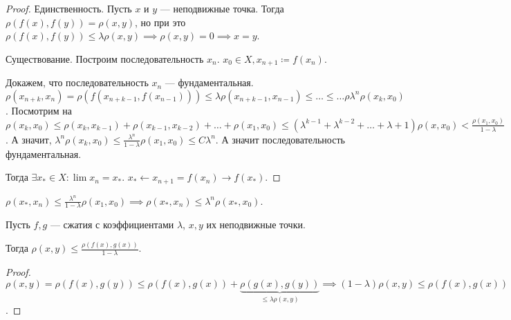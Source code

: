 \begin{proof}
    Единственность. Пусть $x$ и  $y$ --- неподвижные точка. Тогда  $\rho(f(x), f(y)) = \rho(x, y)$, но при это  $\rho(f(x), f(y)) \le \lambda\rho(x, y) \implies \rho(x, y) = 0 \implies x = y$.

    Существование. Построим последовательность $x_n$.  $x_0 \in X, x_{n+1} \coloneqq f(x_n)$.

    Докажем, что последовательность  $x_n$ --- фундаментальная.  $\rho(x_{n+k}, x_n) = \rho(f(x_{n+k-1}, f(x_{n-1}))) \le \lambda \rho(x_{n+k-1}, x_{n-1}) \le \ldots \le \ldots \rho \lambda^n \rho(x_k, x_0)$. Посмотрим на $\rho(x_k, x_0) \le \rho(x_k, x_{k-1}) + \rho(x_{k-1}, x_{k-2}) + \ldots + \rho(x_1, x_0) \le (\lambda^{k-1} + \lambda^{k-2} + \ldots + \lambda +1) \rho(x, x_0) < \frac{\rho(x_1, x_0)}{1-\lambda}$. А значит, $\lambda^n \rho(x_{k}, x_0) \le \frac{\lambda^n}{1-\lambda} \rho(x_1, x_0) \le C\lambda^n$. А значит последовательность фундаментальная.

    Тогда $\exists x_* \in X\!: \lim x_n = x_*$. $x_* \leftarrow x_{n+1} = f(x_n) \to f(x_*)$. 
\end{proof}
\begin{remark}
    $\rho(x_*, x_n) \le \frac{\lambda^n}{1 - \lambda}\rho(x_1, x_0) \implies \rho(x_*, x_n) \le \lambda^n \rho(x_*, x_0)$.
\end{remark}
\begin{consequence}
    Пусть $f, g$ --- сжатия с коэффициентами $\lambda$,  $x, y$ их неподвижные точки.

    Тогда $\rho(x, y) \le \frac{\rho(f(x), g(x))}{1-\lambda}$.
\end{consequence}
\begin{proof}
    $\rho(x, y) = \rho(f(x), g(y)) \le \rho(f(x), g(x)) + \underbrace{\rho(g(x), g(y))}_{\le \lambda \rho(x, y)} \implies (1-\lambda)\rho(x, y) \le \rho(f(x), g(x))$.
\end{proof}
